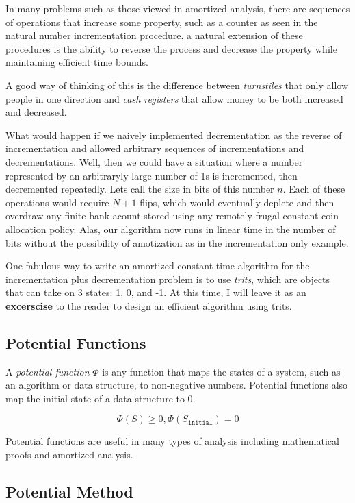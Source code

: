 \documentclass[12pt, letterpaper]{book}
\begin{document}
In many problems such as those viewed in amortized analysis, there are sequences of operations that increase some property, such as a counter as seen in the natural number incrementation procedure. a natural extension of these procedures is the ability to reverse the process and decrease the property while maintaining efficient time bounds.

A good way of thinking of this is the difference between \textit{turnstiles} that only allow people in one direction and \textit{cash registers} that allow money to be both increased and decreased.

What would happen if we naively implemented decrementation as the reverse of incrementation and allowed arbitrary sequences of incrementations and decrementations. Well, then we could have a situation where a number represented by an arbitraryly large number of 1s is incremented, then decremented repeatedly. Lets call the size in bits of this number $n$. Each of these operations would require $N + 1$ flips, which would eventually deplete and then overdraw any finite bank acount stored using any remotely frugal constant coin allocation policy. Alas, our algorithm now runs in linear time in the number of bits without the possibility of amotization as in the incrementation only example.

One fabulous way to write an amortized constant time algorithm for the incrementation plus decrementation problem is to use \textit{trits}, which are objects that can take on 3 states: 1, 0, and -1. At this time, I will leave it as an \textbf{excerscise} to the reader to design an efficient algorithm using trits.

\subsection{Potential Functions}

A \textit{potential function} $\Phi$ is any function that maps the states of a system, such as an algorithm or data structure, to non-negative numbers. Potential functions also map the initial state of a data structure to 0.

$$\Phi(S) \ge 0, \Phi(S_{\texttt{initial}}) = 0$$

Potential functions are useful in many types of analysis including mathematical proofs and amortized analysis.

\newpage

\subsection{Potential Method}
\end{document}
